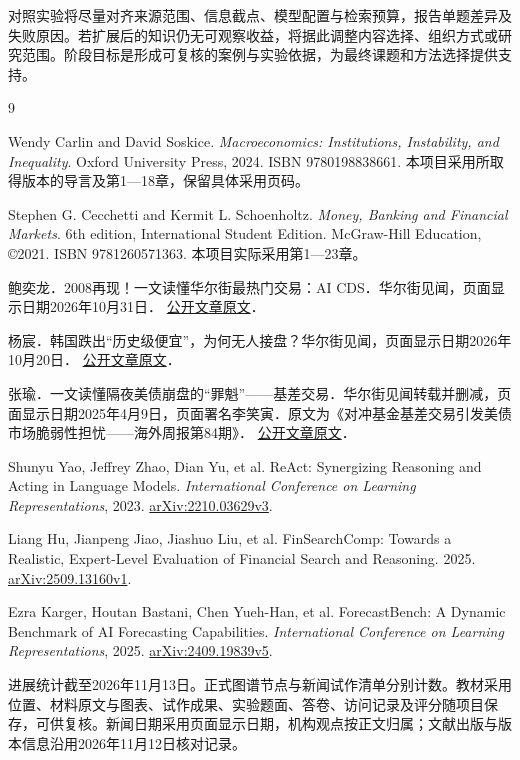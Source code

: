 \documentclass[11pt,letterpaper]{article}
\begin{document}
对照实验将尽量对齐来源范围、信息截点、模型配置与检索预算，报告单题差异及失败原因。若扩展后的知识仍无可观察收益，将据此调整内容选择、组织方式或研究范围。阶段目标是形成可复核的案例与实验依据，为最终课题和方法选择提供支持。

\newpage
\begin{thebibliography}{9}
\small
\setlength{\itemsep}{7pt}
\setlength{\parskip}{0pt}

Wendy Carlin and David Soskice.
\textit{Macroeconomics: Institutions, Instability, and Inequality}.
Oxford University Press, 2024. ISBN 9780198838661.
本项目采用所取得版本的导言及第1—18章，保留具体采用页码。

Stephen G. Cecchetti and Kermit L. Schoenholtz.
\textit{Money, Banking and Financial Markets}.
6th edition, International Student Edition. McGraw-Hill Education, \copyright{}2021.
ISBN 9781260571363. 本项目实际采用第1—23章。

鲍奕龙．2008再现！一文读懂华尔街最热门交易：AI CDS．华尔街见闻，页面显示日期2026年10月31日．
\href{https://wallstreetcn.com/articles/3784900}{公开文章原文}．

杨宸．韩国跌出“历史级便宜”，为何无人接盘？华尔街见闻，页面显示日期2026年10月20日．
\href{https://wallstreetcn.com/articles/3784053}{公开文章原文}．

张瑜．一文读懂隔夜美债崩盘的“罪魁”——基差交易．华尔街见闻转载并删减，页面显示日期2025年4月9日，页面署名李笑寅．原文为《对冲基金基差交易引发美债市场脆弱性担忧——海外周报第84期》．
\href{https://wallstreetcn.com/articles/3744871}{公开文章原文}．

Shunyu Yao, Jeffrey Zhao, Dian Yu, et al.
ReAct: Synergizing Reasoning and Acting in Language Models.
\textit{International Conference on Learning Representations}, 2023.
\href{https://arxiv.org/abs/2210.03629v3}{arXiv:2210.03629v3}.

Liang Hu, Jianpeng Jiao, Jiashuo Liu, et al.
FinSearchComp: Towards a Realistic, Expert-Level Evaluation of Financial Search and Reasoning.
2025. \href{https://arxiv.org/abs/2509.13160v1}{arXiv:2509.13160v1}.

Ezra Karger, Houtan Bastani, Chen Yueh-Han, et al.
ForecastBench: A Dynamic Benchmark of AI Forecasting Capabilities.
\textit{International Conference on Learning Representations}, 2025.
\href{https://arxiv.org/abs/2409.19839v5}{arXiv:2409.19839v5}.

\end{thebibliography}


\vspace{8pt}
{\small
{}
进展统计截至2026年11月13日。正式图谱节点与新闻试作清单分别计数。教材采用位置、材料原文与图表、试作成果、实验题面、答卷、访问记录及评分随项目保存，可供复核。新闻日期采用页面显示日期，机构观点按正文归属；文献出版与版本信息沿用2026年11月12日核对记录。
}
\end{document}
